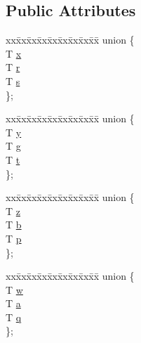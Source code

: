 \subsection*{Public Attributes}
\begin{DoxyCompactItemize}
\item 
\begin{tabbing}
xx\=xx\=xx\=xx\=xx\=xx\=xx\=xx\=xx\=\kill
union \{\\
\>T \mbox{\hyperlink{structglm_1_1tvec4_a7998eea40494693ac46e2772fa20e6f2}{x}}\\
\>T \mbox{\hyperlink{structglm_1_1tvec4_a73501d811cd6e9d4a3cce708445cace5}{r}}\\
\>T \mbox{\hyperlink{structglm_1_1tvec4_a8d6d8de5a61b16e045bd1e8a85feeb67}{s}}\\
\}; \\

\end{tabbing}\item 
\begin{tabbing}
xx\=xx\=xx\=xx\=xx\=xx\=xx\=xx\=xx\=\kill
union \{\\
\>T \mbox{\hyperlink{structglm_1_1tvec4_ac2e96cd66dfa6d44c4b0e0f15897500a}{y}}\\
\>T \mbox{\hyperlink{structglm_1_1tvec4_a6a4bfbcc21a945872fff820661a84669}{g}}\\
\>T \mbox{\hyperlink{structglm_1_1tvec4_ac0ff5b73b4b17e668bf87803b50861c9}{t}}\\
\}; \\

\end{tabbing}\item 
\begin{tabbing}
xx\=xx\=xx\=xx\=xx\=xx\=xx\=xx\=xx\=\kill
union \{\\
\>T \mbox{\hyperlink{structglm_1_1tvec4_a137c815b36e9331209349644c61160a6}{z}}\\
\>T \mbox{\hyperlink{structglm_1_1tvec4_a9f8158e691c3b15b078d9b61f93b69ca}{b}}\\
\>T \mbox{\hyperlink{structglm_1_1tvec4_a97852a5b9ca0179197ecfd9a43fb977f}{p}}\\
\}; \\

\end{tabbing}\item 
\begin{tabbing}
xx\=xx\=xx\=xx\=xx\=xx\=xx\=xx\=xx\=\kill
union \{\\
\>T \mbox{\hyperlink{structglm_1_1tvec4_a2a6f7d33e64cf0b38ec82403be5073e4}{w}}\\
\>T \mbox{\hyperlink{structglm_1_1tvec4_af29edf476662a7e12d5ded3b71376394}{a}}\\
\>T \mbox{\hyperlink{structglm_1_1tvec4_a9f1e124aa9bb942f1db4b72d0d7c7569}{q}}\\
\}; \\

\end{tabbing}\end{DoxyCompactItemize}


